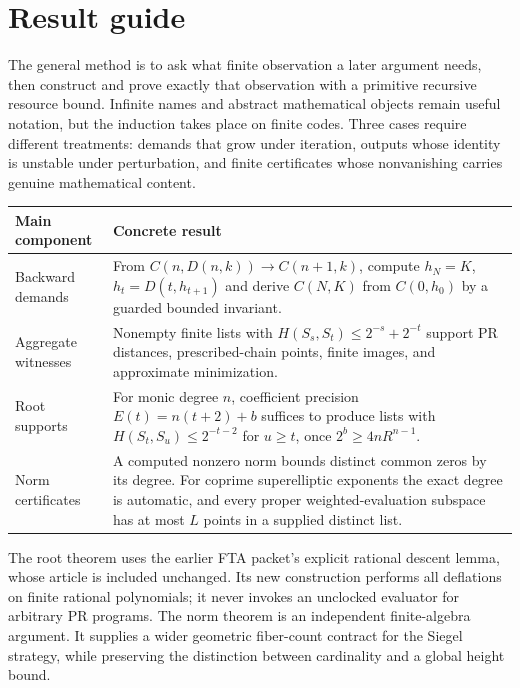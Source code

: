 \documentclass[11pt,oneside]{article}
\theoremstyle{definition}
\theoremstyle{remark}
\begin{document}
\clearpage
\section*{Result guide}

The general method is to ask what finite observation a later argument
needs, then construct and prove exactly that observation with a primitive
recursive resource bound. Infinite names and abstract mathematical
objects remain useful notation, but the induction takes place on finite
codes. Three cases require different treatments: demands that grow under
iteration, outputs whose identity is unstable under perturbation, and
finite certificates whose nonvanishing carries genuine mathematical
content.

\begin{center}
\begin{tabular}{@{}p{}p{}@{}}
\toprule
Main component & Concrete result\\
\midrule
Backward demands & From $C(n,D(n,k))\to C(n+1,k)$, compute
$h_N=K$, $h_t=D(t,h_{t+1})$ and derive $C(N,K)$ from
$C(0,h_0)$ by a guarded bounded invariant.\\[6pt]
Aggregate witnesses & Nonempty finite lists with
$H(S_s,S_t)\le2^{-s}+2^{-t}$ support PR distances, prescribed-chain
points, finite images, and approximate minimization.\\[6pt]
Root supports & For monic degree $n$, coefficient precision
$E(t)=n(t+2)+b$ suffices to produce lists with
$H(S_t,S_u)\le2^{-t-2}$ for $u\ge t$, once
$2^b\ge4nR^{n-1}$.\\[6pt]
Norm certificates & A computed nonzero norm bounds distinct common
zeros by its degree. For coprime superelliptic exponents the exact degree
is automatic, and every proper weighted-evaluation subspace has at most
$L$ points in a supplied distinct list.\\
\bottomrule
\end{tabular}
\end{center}

The root theorem uses the earlier FTA packet's explicit rational descent
lemma, whose article is included unchanged. Its new construction performs
all deflations on finite rational polynomials; it never invokes an
unclocked evaluator for arbitrary PR programs. The norm theorem is an
independent finite-algebra argument. It supplies a wider geometric
fiber-count contract for the Siegel strategy, while preserving the
distinction between cardinality and a global height bound.

\clearpage
{\footnotesize\setlength{\parskip}{0pt}\tableofcontents}
\clearpage







\clearpage

\end{document}
